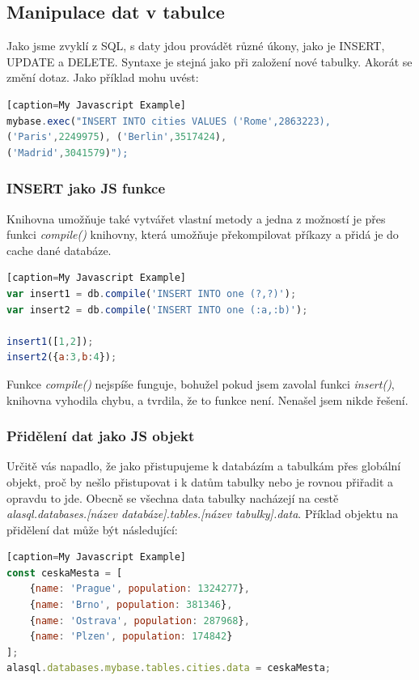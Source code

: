 \documentclass[a4, titlepage]{article}
\begin{document}
\subsection{Manipulace dat v tabulce}
Jako jsme zvyklí z SQL, s daty jdou provádět různé úkony, jako je INSERT, UPDATE a DELETE. Syntaxe je stejná jako při založení nové tabulky. Akorát se změní dotaz. Jako příklad mohu uvést:

\begin{lstlisting}[language=JavaScript][caption=My Javascript Example]
mybase.exec("INSERT INTO cities VALUES ('Rome',2863223), 
('Paris',2249975), ('Berlin',3517424),  
('Madrid',3041579)");
\end{lstlisting}

\subsubsection*{INSERT jako JS funkce}
Knihovna umožňuje také vytvářet vlastní metody a jedna z možností je přes funkci \textit{compile()} knihovny, která umožňuje překompilovat příkazy a přidá je do cache dané databáze.

\begin{lstlisting}[language=JavaScript][caption=My Javascript Example]
var insert1 = db.compile('INSERT INTO one (?,?)');
var insert2 = db.compile('INSERT INTO one (:a,:b)');

insert1([1,2]);
insert2({a:3,b:4});
\end{lstlisting}

Funkce \textit{compile()} nejspíše funguje, bohužel pokud jsem zavolal funkci \textit{insert()}, knihovna vyhodila chybu, a tvrdila, že to funkce není. Nenašel jsem nikde řešení.


\subsubsection*{Přidělení dat jako JS objekt}
Určitě vás napadlo, že jako přistupujeme k databázím a tabulkám přes globální objekt, proč by nešlo přistupovat i k datům tabulky nebo je rovnou přiřadit a opravdu to jde. Obecně se všechna data tabulky nacházejí na cestě \textit{alasql.databases.[název databáze].tables.[název tabulky].data}. Příklad objektu na přidělení dat může být následující:

\begin{lstlisting}[language=JavaScript][caption=My Javascript Example]
const ceskaMesta = [
    {name: 'Prague', population: 1324277},
    {name: 'Brno', population: 381346},
    {name: 'Ostrava', population: 287968},
    {name: 'Plzen', population: 174842}
];
alasql.databases.mybase.tables.cities.data = ceskaMesta;
\end{lstlisting}
\end{document}
